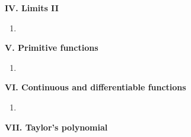 \documentclass{article}
\newcommand{\<}{\left<}
\renewcommand{\>}{\right>}
\begin{document}
\begin{multicols}{3}
    \textbf{IV. Limits II}

    \begin{enumerate}[itemsep=2pt, topsep=2pt, partopsep=2pt, parsep=2pt]

        \item

    \end{enumerate}

    \textbf{V. Primitive functions}

    \begin{enumerate}[itemsep=2pt, topsep=2pt, partopsep=2pt, parsep=2pt]

        \item

    \end{enumerate}

    \textbf{VI. Continuous and differentiable functions}

    \begin{enumerate}[itemsep=2pt, topsep=2pt, partopsep=2pt, parsep=2pt]

        \item

    \end{enumerate}

    \textbf{VII. Taylor's polynomial}

    \begin{enumerate}[itemsep=2pt, topsep=2pt, partopsep=2pt, parsep=2pt]


\end{enumerate}
\end{multicols}
\end{document}
